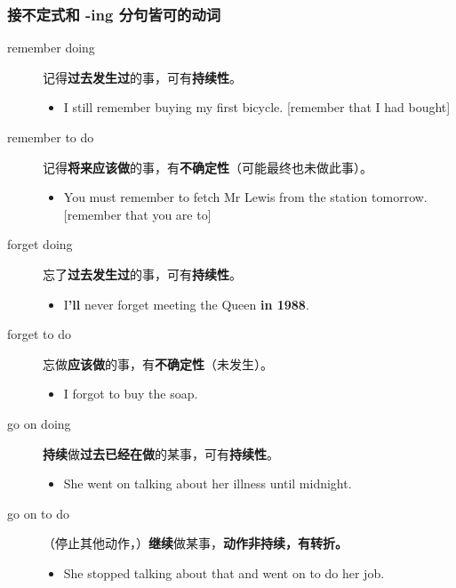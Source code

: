 \subsubsection{接不定式和 -ing 分句皆可的动词}

\begin{description}
\item[remember doing] 记得\textbf{过去发生过}的事，可有\textbf{持续性}。
  \begin{itemize}
  \item I still remember buying my first bicycle. [remember that I had bought]
  \end{itemize}

\item[remember to do] 记得\textbf{将来应该做}的事，有\textbf{不确定性}（可能最终也未做此事）。
  \begin{itemize}
  \item You must remember to fetch Mr Lewis from the station tomorrow. [remember
    that you are to]
  \end{itemize}


\item[forget doing] 忘了\textbf{过去发生过}的事，可有\textbf{持续性}。
  \begin{itemize}
  \item I\textbf{'ll} never forget meeting the Queen \textbf{in 1988}.
  \end{itemize}

\item[forget to do] 忘做\textbf{应该做}的事，有\textbf{不确定性}（未发生）。
  \begin{itemize}
  \item I forgot to buy the soap.
  \end{itemize}


\item[go on doing] \textbf{持续}做\textbf{过去已经在做}的某事，可有\textbf{持续性}。
  \begin{itemize}
  \item She went on talking about her illness until midnight.
  \end{itemize}


\item[go on to do] （停止其他动作，）\textbf{继续}做某事，\textbf{动作非持续，有转折。}

  \begin{itemize}
  \item She stopped talking about that and went on to do her job.
  \end{itemize}



\end{description}
